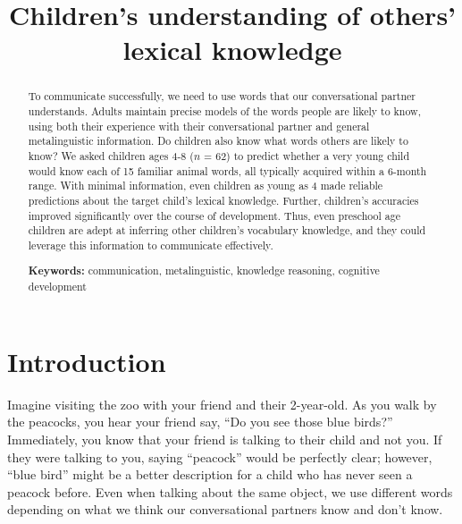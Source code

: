 \documentclass[10pt, letterpaper]{article}
\title{Children's understanding of others' lexical knowledge}
\begin{document}
\maketitle

\begin{abstract}
To communicate successfully, we need to use words that our
conversational partner understands. Adults maintain precise models of
the words people are likely to know, using both their experience with
their conversational partner and general metalinguistic information. Do
children also know what words others are likely to know? We asked
children ages 4-8 (\(n\) = 62) to predict whether a very young child
would know each of 15 familiar animal words, all typically acquired
within a 6-month range. With minimal information, even children as young
as 4 made reliable predictions about the target child's lexical
knowledge. Further, children's accuracies improved significantly over
the course of development. Thus, even preschool age children are adept
at inferring other children's vocabulary knowledge, and they could
leverage this information to communicate effectively.

\textbf{Keywords:}
communication, metalinguistic, knowledge reasoning, cognitive
development
\end{abstract}

\hypertarget{introduction}{%
\section{Introduction}\label{introduction}}

Imagine visiting the zoo with your friend and their 2-year-old. As you
walk by the peacocks, you hear your friend say, ``Do you see those blue
birds?'' Immediately, you know that your friend is talking to their
child and not you. If they were talking to you, saying ``peacock'' would
be perfectly clear; however, ``blue bird'' might be a better description
for a child who has never seen a peacock before. Even when talking about
the same object, we use different words depending on what we think our
conversational partners know and don't know.
\end{document}
